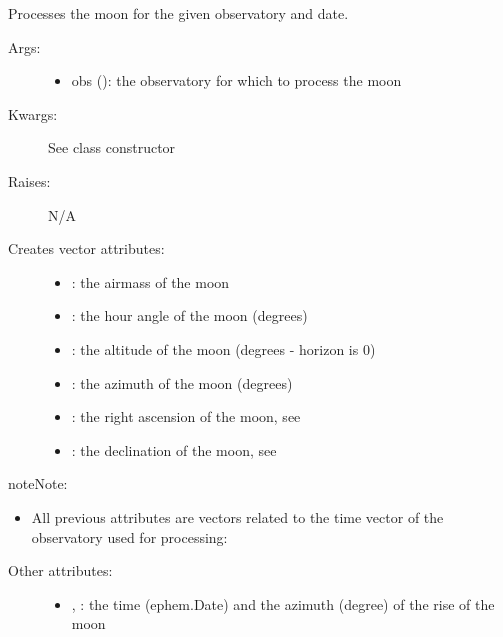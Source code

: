 \documentclass[letterpaper,10pt,english]{sphinxmanual}
\begin{document}
\begin{fulllineitems}

\begin{fulllineitems}
\label{astroobs:astroobs.Moon.process}
Processes the moon for the given observatory and date.
\begin{description}
\item[{Args:}] \leavevmode\begin{itemize}
\item {} 
obs (): the observatory for which to process the moon

\end{itemize}

\item[{Kwargs:}] \leavevmode
See class constructor

\item[{Raises:}] \leavevmode
N/A

\item[{Creates vector attributes:}] \leavevmode\begin{itemize}
\item {} 
: the airmass of the moon

\item {} 
: the hour angle of the moon (degrees)

\item {} 
: the altitude of the moon (degrees - horizon is 0)

\item {} 
: the azimuth of the moon (degrees)

\item {} 
: the right ascension of the moon, see 

\item {} 
: the declination of the moon, see 

\end{itemize}

\end{description}

\begin{notice}{note}{Note:}\begin{itemize}
\item {} 
All previous attributes are vectors related to the time vector of the observatory used for processing: 

\end{itemize}
\end{notice}
\begin{description}
\item[{Other attributes:}] \leavevmode\begin{itemize}
\item {} 
, : the time (ephem.Date) and the azimuth (degree) of the rise of the moon


\end{itemize}
\end{description}
\end{fulllineitems}
\end{fulllineitems}
\end{document}
